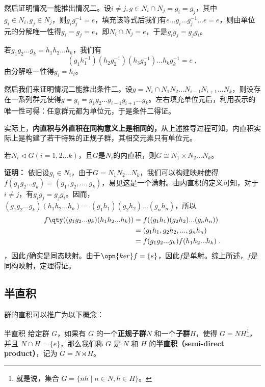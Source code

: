 然后证明情况一能推出情况二。设$i\neq j,g\in N_i\cap N_j=g_i=g_j$，其中$g_i\in N_i,g_j\in N_j$，则$g_ig_j^{-1}=e$，填充该等式后我们有$e...g_i...g_j^{-1}...e=e$，则由单位元的分解唯一性得$g_i=g_j=e$，即$N_i\cap N_j=e$，于是$g_ig_j=g_jg_i$。


若$g_1g_2...g_k=h_1h_2...h_k$，我们有
\begin{equation}
(g_1h_1^{-1})(h_2g_2^{-1})(h_3g_3^{-1})...h_kg_k^{-1}=e~,
\end{equation}
由分解唯一性得$g_i=h_i$。

然后我们来证明情况二能推出条件二。设$g=N_i\cap N_1N_2...N_{i-1}N_{i+1}...N_k$，则设存在一系列群元使得$g=g_i=g_1g_2...g_{i-1}g_{i+1}...g_k$。左右填充单位元后，利用表示的唯一性可得：任意群元都为单位元，于是条件二得证。


实际上，\textbf{内直积与外直积在同构意义上是相同的，}从上述推导过程可知，内直积实际上是构建了若干特殊的正规子群，其相交元素只有单位元。
\begin{theorem}{}
若$N_i\triangleleft G(i=1,2...k)$，且$G$是$N_i$的内直积，则$G\cong N_1\times N_2...N_k$。
\end{theorem}
\textbf{证明：}
依旧设$g_i\in N_i$，由于$G=N_1N_2...N_k$，我们可以构建映射使得$f(g_1g_2...g_k)=(g_1,g_2,...,g_k)$，易见这是一个满射。由内直积的定义可知，对于$i\neq j$，有$g_ig_j=g_jg_i$。因而，$(g_1g_2...g_k)(h_1h_2...h_k)=(g_1h_1)(g_2h_2)...(g_nh_n)$，所以
\begin{equation}
\begin{aligned}
f\qty((g_1g_2...g_k)(h_1h_2...h_k))&=f((g_1h_1)(g_2h_2)...(g_nh_n))\\
&=(g_1h_1,g_2h_2,...,g_nh_n)\\
&=f(g_1g_2...g_k)f(h_1h_2...h_k)~.
\end{aligned}
\end{equation}
，因此$f$确实是同态映射。由于$\opn{ker}f=\{e\}$，因此$f$是单射。综上所述，$f$是同构映射，定理得证。


\subsection{半直积}

群的直积可以推广为以下概念：

\begin{definition}{半直积}
给定群 $G$，如果有 $G$ 的一个\textbf{正规子群}$N$ 和一个\textbf{子群}$H$，使得 $G = N H$\footnote{就是说，集合 $G= \{n h \mid n \in N, h\in H\}$。}，并且 $N \cap H = \{e\}$，那么我们称 $G$ 是 $N$ 和 $H$ 的\textbf{半直积（semi-direct product）}，记为 $G = N \rtimes H$。
\end{definition}

